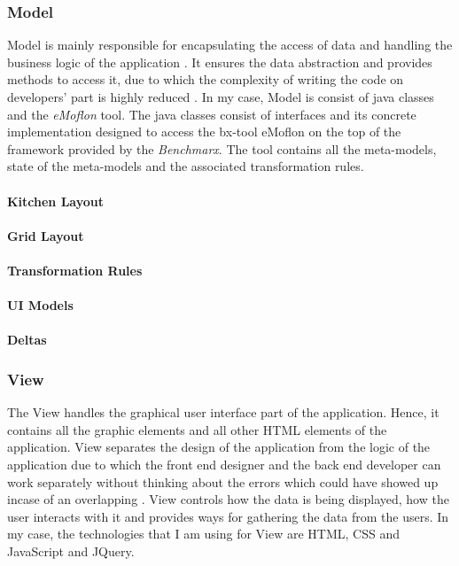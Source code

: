 \subsubsection{Model}\label{subsubsec:model}
Model is mainly responsible for encapsulating the access of data and handling the business logic of the application \cite{designpattern-headfirst} \cite{mvc-arch}. It ensures the data abstraction and provides methods to access it, due to which the complexity of writing the code on developers' part is highly reduced \cite{mdd-webwithmvc}.
\newline\newline In my case, Model is consist of java classes and the \textit{eMoflon} tool. The java classes consist of interfaces and its concrete implementation designed to access the bx-tool eMoflon on the top of the framework provided by the \textit{Benchmarx}. The tool contains all the meta-models, state of the meta-models and the associated transformation rules.
\paragraph{Kitchen Layout}
\paragraph{Grid Layout}
\paragraph{Transformation Rules}
\paragraph{UI Models}
\paragraph{Deltas}

\subsubsection{View}\label{subsubsec:view}
The View handles the graphical user interface part of the application. Hence, it contains all the graphic elements and all other HTML elements of the application. View separates the design of the application from the logic of the application due to which the front end designer and the back end developer can work separately without thinking about the errors which could have showed up incase of an overlapping \cite{designpattern-headfirst} \cite{mvc-arch}. View controls how the data is being displayed,
how the user interacts with it and provides ways for gathering the data from the users. 
\newline\newline In my case, the technologies that I am using for View are HTML, CSS and JavaScript and JQuery.

